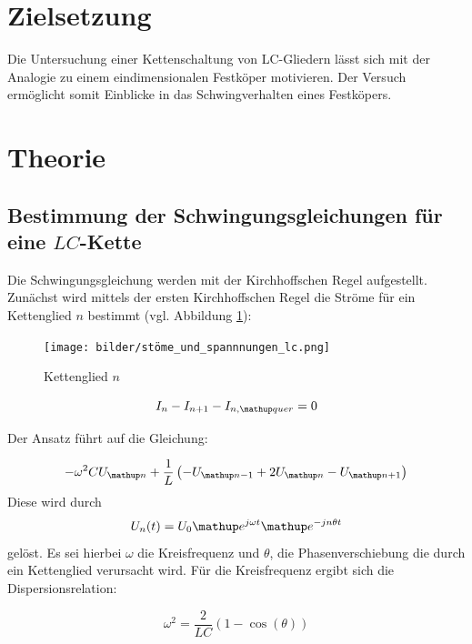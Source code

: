 \setcounter{page}{1}
\section*{Zielsetzung}
Die Untersuchung einer Kettenschaltung von LC-Gliedern lässt sich mit der Analogie
zu einem eindimensionalen Festköper motivieren.
Der Versuch ermöglicht somit Einblicke in das Schwingverhalten eines
Festköpers. %

\section{Theorie}

\subsection{Bestimmung der Schwingungsgleichungen für eine $LC$-Kette} %
Die Schwingungsgleichung werden mit der Kirchhoffschen Regel aufgestellt. %
Zunächst wird mittels der ersten Kirchhoffschen Regel die Ströme für ein Kettenglied $n$ %
bestimmt (vgl. Abbildung \ref{fig:kettenglied}):

\begin{figure}
  \centering
  \texttt{[image: bilder/stöme\_und\_spannnungen\_lc.png]}
  \caption{Kettenglied $n$} %
  \label{fig:kettenglied}
\end{figure}

\begin{equation}
\label{eq:kircheins_lc}
I_n-I_{n+1}-I_{n,\map{quer}}=0
\end{equation}

Der Ansatz führt auf die Gleichung:

\begin{equation}
\label{eq:gleichung_lc}
-\omega^2CU\ua{n}+\frac{1}{L}\left(-U\ua{n-1}+2U\ua{n}-U\ua{n+1}\right)
\end{equation}
Diese wird durch
\begin{equation}
\label{eq:loesung_gleichung_lc}
U_n(t)=U_0 \map{e}^{j\omega t} \map{e}^{-jn\theta t}
\end{equation}
gelöst.
Es sei hierbei $\omega$ die Kreisfrequenz und $\theta$, die Phasenverschiebung %
die durch ein Kettenglied verursacht wird.
Für die Kreisfrequenz ergibt sich die Dispersionsrelation:

\begin{equation}
\label{eq:kreisfrequenz_lc_glied}
\omega^2=\frac{2}{LC}\left(1-\cos(\theta)\right)
\end{equation}

